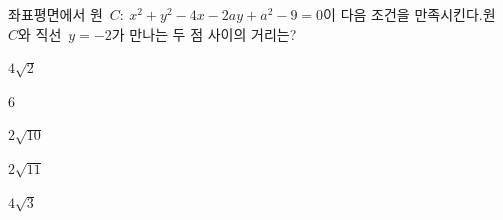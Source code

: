 좌표평면에서 원~$C:\ x^2+y^2-4x-2ay+a^2-9=0$이 다음 조건을 만족시킨다.원~$C$와 직선~$y=-2$가 만나는 두 점 사이의 거리는? 
\begin{choices32}{\rule[-3ex]{0pt}{8ex}$4\sqrt{2}$}{\rule[-3ex]{0pt}{8ex}$6$}{\rule[-3ex]{0pt}{8ex}$2\sqrt{10}$}{\rule[-3ex]{0pt}{8ex}$2\sqrt{11}$}{\rule[-3ex]{0pt}{8ex}$4\sqrt{3}$}\end{choices32}
